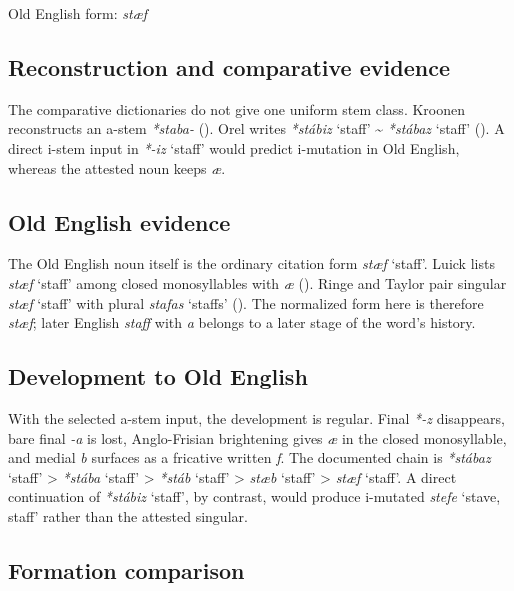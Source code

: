\documentclass[
  british,
  a4paper,
  openany]{book}
\providecommand{\Recon}[1]{\emph{*#1}}
{\catcode`→=\active \global\def→{\ensuremath{\rightarrow}}}
\providecommand{\Recon}[1]{\emph{*#1}}
{\catcode`→=\active \global\def→{\ensuremath{\rightarrow}}}
\begin{document}
Old English form: \emph{stæf}

\subsection{Reconstruction and comparative
evidence}\label{reconstruction-and-comparative-evidence-97}

The comparative dictionaries do not give one uniform stem class. Kroonen
reconstructs an a-stem \emph{*staba-}
(). Orel writes
{\Recon{stábiz} `staff'} \textasciitilde{} {\Recon{stábaz} `staff'}
(). A direct i-stem input in
\Recon{-iz} `staff' would predict i-mutation in Old English, whereas the
attested noun keeps \emph{æ}.

\subsection{Old English evidence}\label{old-english-evidence-97}

The Old English noun itself is the ordinary citation form {\emph{stæf}}
`staff'. Luick lists {\emph{stæf}} `staff' among closed monosyllables
with \emph{æ} (). Ringe
and Taylor pair singular {\emph{stæf}} `staff' with plural
{\emph{stafas}} `staffs' (). The normalized form here is therefore \emph{stæf};
later English \emph{staff} with \emph{a} belongs to a later stage of the
word's history.

\subsection{Development to Old
English}\label{development-to-old-english-97}

With the selected a-stem input, the development is regular. Final
\emph{*-z} disappears, bare final \emph{-a} is lost, Anglo-Frisian
brightening gives \emph{æ} in the closed monosyllable, and medial
\emph{b} surfaces as a fricative written \emph{f}. The documented chain
is \Recon{stábaz} `staff' \textgreater{} \Recon{stába} `staff'
\textgreater{} \Recon{stáb} `staff' \textgreater{} \emph{stæb} `staff'
\textgreater{} \emph{stæf} `staff'. A direct continuation of
\Recon{stábiz} `staff', by contrast, would produce i-mutated
{\emph{stefe}} `stave, staff' rather than the attested singular.

\subsection{Formation comparison}\label{formation-comparison-5}
\end{document}
